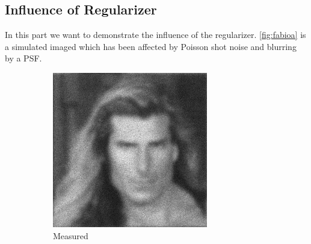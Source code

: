 \documentclass{juliacon}
\begin{document}
    \subsection{Influence of Regularizer}
        In this part we want to demonstrate the influence of the regularizer.
        \autoref{fig:fabioa} is a simulated imaged which has been affected by Poisson shot noise and blurring by a PSF.
        \begin{figure}[h]
            \begin{subfigure}[b]{.166\textwidth}
                \centering
                \includegraphics[width=\textwidth]{figures/fabio_blurry.png}
                \caption{Measured}
                \label{fig:fabioa}
            \end{subfigure}%
            \begin{subfigure}[b]{.166\textwidth}
                \centering

\end{subfigure}
\end{figure}
\end{document}
